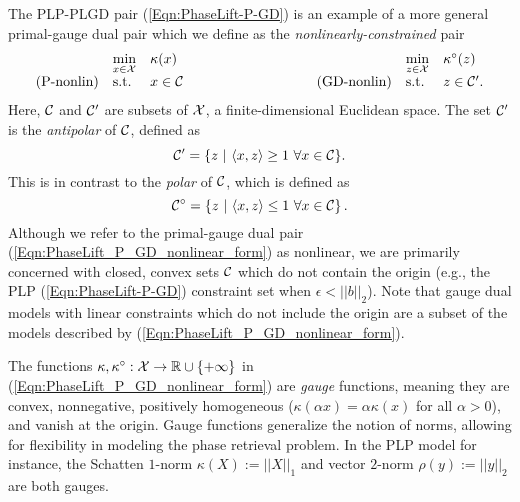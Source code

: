 The PLP-PLGD pair (\ref{Eqn:PhaseLift-P-GD}) is an example of a more general primal-gauge dual pair which we define as the \textit{nonlinearly-constrained} pair
\begin{equation} 			\label{Eqn:PhaseLift_P_GD_nonlinear_form}
\begin{array}{lllllll}
	&	\min\limits_{\substack{x \in \caX}}
		&	\kappa(x)
			&
				&	\min\limits_{\substack{z \in \caX}}
					&	\kappa^\circ(z)
						\\
\textnormal{(P-nonlin)}
	&	\st
		& 	x \in \caC
			&	\hspace{3cm} 	\textnormal{(GD-nonlin)}
				&	\st
					&	z \in \caC'.
\end{array}
\end{equation}
Here, ${\mathcal C}$ and ${\mathcal C}'$ are subsets of ${\mathcal X}$, a finite-dimensional Euclidean space.  The set ${\mathcal C}'$ is the \textit{antipolar} of ${\mathcal C}$, defined as
\begin{equation}  			\label{Def:antipolar_set}
{\mathcal C}' = \{ z \ | \ \langle x, z \rangle \geq 1 \ \forall x \in {\mathcal C} \}.
\end{equation}
This is in contrast to the \textit{polar} of ${\mathcal C}$, which is defined as
\begin{equation} 			\label{Def:polar}
{\mathcal C}^\circ = \left\{ z \ | \ \langle x, z \rangle \leq 1 \ \forall x \in {\mathcal C} \right\}.
\end{equation}
Although we refer to the primal-gauge dual pair (\ref{Eqn:PhaseLift_P_GD_nonlinear_form}) as nonlinear, we are primarily concerned with closed, convex sets ${\mathcal C}$ which do not contain the origin (e.g., the PLP (\ref{Eqn:PhaseLift-P-GD}) constraint set when $\epsilon < ||b||_2$).  
Note that gauge dual models with linear constraints which do not include the origin are a subset of the models described by (\ref{Eqn:PhaseLift_P_GD_nonlinear_form}).

The functions $\kappa, \kappa^\circ : {\mathcal X} \rightarrow {\mathbb R} \cup \{+\infty\}$ in (\ref{Eqn:PhaseLift_P_GD_nonlinear_form}) are \textit{gauge} functions, meaning they are convex, nonnegative, positively homogeneous ($\kappa(\alpha x) = \alpha \kappa(x)$ for all $\alpha > 0$), and vanish at the origin.  Gauge functions generalize the notion of norms, allowing for flexibility in modeling the phase retrieval problem.  In the PLP model for instance, the Schatten $1$-norm $\kappa(X) := || X ||_1$ and  vector $2$-norm $\rho(y) := ||y||_2$ are both gauges.

